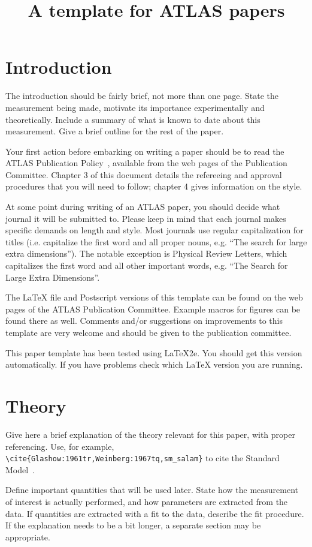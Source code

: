 \documentclass[11pt,a4paper]{../atlasnote}
\title{A template for ATLAS papers}
\begin{document}
\tableofcontents
\clearpage

\section{Introduction}

The introduction should be fairly brief, not more than one page.
State the measurement being made, motivate its importance
experimentally and theoretically. Include a summary of what is known
to date about this measurement. Give a brief outline for the rest of
the paper.

Your first action before embarking on writing a paper should be to
read the ATLAS Publication Policy~\cite{publication_policy}, available
from the web pages of the Publication Committee. Chapter 3 of this
document details the refereeing and approval procedures that you will
need to follow; chapter 4 gives information on the style.

At some point during writing of an ATLAS paper, you should decide what
journal it will be submitted to.  Please keep in mind that each
journal makes specific demands on length and style.  Most journals use
regular capitalization for titles (i.e. capitalize the first word and
all proper nouns, e.g. ``The search for large extra dimensions''). The
notable exception is Physical Review Letters, which capitalizes the
first word and all other important words, e.g. ``The Search for Large
Extra Dimensions''.

The \LaTeX{} file and Postscript versions of this template can be
found on the web pages of the ATLAS Publication Committee. Example
macros for figures can be found there as well.  Comments and/or
suggestions on improvements to this template are very welcome and
should be given to the publication committee.

This paper template has been tested using \LaTeX{}2e.  You should get
this version automatically. If you have problems check which \LaTeX{}
version you are running.

\section{Theory}

Give here a brief explanation of the theory relevant for this paper,
with proper referencing. Use, for example,
\verb|\cite{Glashow:1961tr,Weinberg:1967tq,sm_salam}| to cite the
Standard Model~\cite{Glashow:1961tr,Weinberg:1967tq,sm_salam}.

Define important quantities that will be used later.  State how the
measurement of interest is actually performed, and how parameters are
extracted from the data.  If quantities are extracted with a fit to
the data, describe the fit procedure. If the explanation needs to be a
bit longer, a separate section may be appropriate.
\end{document}
